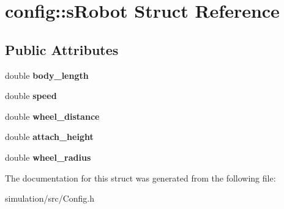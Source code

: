 \hypertarget{structconfig_1_1s_robot}{}\section{config\+:\+:s\+Robot Struct Reference}
\label{structconfig_1_1s_robot}
\subsection*{Public Attributes}
\begin{DoxyCompactItemize}
\item 
\mbox{\label{structconfig_1_1s_robot_a825d14248f65e3eeeb159c2cb54ab3cb}} 
double {\bfseries body\+\_\+length}
\item 
\mbox{\label{structconfig_1_1s_robot_ab3ed79becfa66c518fcef7583b8a5179}} 
double {\bfseries speed}
\item 
\mbox{\label{structconfig_1_1s_robot_a4a22c395cc9d20e8c3e424129bb5ccc6}} 
double {\bfseries wheel\+\_\+distance}
\item 
\mbox{\label{structconfig_1_1s_robot_a2b7da73a6f21f32ee3ab0262e804f889}} 
double {\bfseries attach\+\_\+height}
\item 
\mbox{\label{structconfig_1_1s_robot_a097bf4c624355c380b64216da30514ec}} 
double {\bfseries wheel\+\_\+radius}
\end{DoxyCompactItemize}


The documentation for this struct was generated from the following file\+:\begin{DoxyCompactItemize}
\item 
simulation/src/Config.\+h\end{DoxyCompactItemize}
